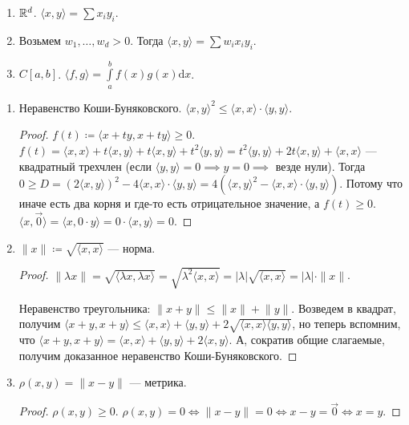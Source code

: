 \begin{example}
    \begin{enumerate}
        \item $\mathbb{R}^d$.  $\langle x, y\rangle = \sum x_iy_i$.
        \item Возьмем $w_1, \ldots, w_d > 0$. Тогда $\langle x, y \rangle = \sum w_i x_i y_i$.
        \item $C[a, b]$.  $\langle f, g \rangle = \int\limits_a^b f(x)g(x) \mathrm{d}x$.
    \end{enumerate}
\end{example}
\begin{properties}
    \begin{enumerate}
        \item Неравенство Коши-Буняковского. $\langle x, y \rangle^2 \le \langle x, x \rangle \cdot \langle y, y\rangle$.
            \begin{proof}
                $f(t) \coloneqq \langle x+ty, x +ty \rangle \ge 0$. $f(t) = \langle x, x \rangle + t\langle x, y \rangle + t\langle x, y \rangle + t^2 \langle y, y \rangle = t^2 \langle y, y\rangle + 2t\langle x, y \rangle + \langle x, x \rangle$ --- квадратный трехчлен (если $\langle y, y \rangle = 0 \implies y = 0 \implies$ везде нули). Тогда $0 \ge D= (2\langle x, y \rangle)^2 - 4 \langle x, x\rangle \cdot \langle y, y \rangle = 4(\langle x, y \rangle^2 - \langle x, x\rangle \cdot \langle y, y \rangle)$. Потому что иначе есть два корня и где-то есть отрицательное значение, а $f(t) \geq 0$.\\
                $\langle x, \overrightarrow{0} \rangle = \langle x, 0 \cdot y \rangle = 0 \cdot \langle x, y \rangle = 0$.
            \end{proof}
        \item $\|x\| \coloneqq \sqrt{\langle x, x \rangle}$ --- норма.
             \begin{proof}
                $\|\lambda x\| = \sqrt{\langle \lambda x, \lambda x\rangle} = \sqrt{\lambda^2\langle x, x \rangle} = |\lambda| \sqrt{\langle x, x \rangle} = |\lambda| \cdot \|x\|$.

                Неравенство треугольника: $\lVert x+y \rVert \le \lVert x \rVert + \lVert y \rVert$.
                Возведем в квадрат, получим $\langle x + y, x + y\rangle \le \langle x, x\rangle + \langle y, y\rangle + 2\sqrt{\langle x, x\rangle\langle y, y\rangle}$, но теперь вспомним, что $\langle x + y, x + y\rangle = \langle x, x\rangle + \langle y, y\rangle + 2\langle x, y\rangle$.
                А, сократив общие слагаемые, получим доказанное неравенство Коши-Буняковского.
            \end{proof}
        \item $\rho(x, y) = \lVert x - y \rVert$ --- метрика.
            \begin{proof}
                $\rho(x, y) \ge 0$. $\rho(x, y) = 0 \iff \lVert x - y \rVert = 0 \iff x - y = \overrightarrow{0} \iff x = y$.


\end{proof}
\end{enumerate}
\end{properties}
